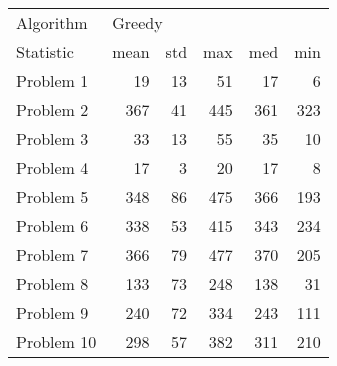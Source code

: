\begin{tabular}{lrrrrr}
\toprule
Algorithm & \multicolumn{5}{l}{Greedy} \\
Statistic &   mean & std &  max &  med &  min \\
\midrule
Problem 1  &     19 &  13 &   51 &   17 &    6 \\
Problem 2  &    367 &  41 &  445 &  361 &  323 \\
Problem 3  &     33 &  13 &   55 &   35 &   10 \\
Problem 4  &     17 &   3 &   20 &   17 &    8 \\
Problem 5  &    348 &  86 &  475 &  366 &  193 \\
Problem 6  &    338 &  53 &  415 &  343 &  234 \\
Problem 7  &    366 &  79 &  477 &  370 &  205 \\
Problem 8  &    133 &  73 &  248 &  138 &   31 \\
Problem 9  &    240 &  72 &  334 &  243 &  111 \\
Problem 10 &    298 &  57 &  382 &  311 &  210 \\
\bottomrule
\end{tabular}
